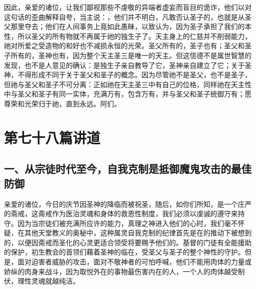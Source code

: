 因此，亲爱的诸位，让我们鄙视那些不虔敬的异端者虚妄而盲目的诡诈，他们以对这句话的歪曲解释自夸，当主说：，他们并不明白，凡敢否认圣子的，也就是从圣父那里夺去；他们在人间事务上竟如此愚昧，以致认为，因为圣子承担了我们的本性，所以圣父的所有物就不再属于祂的独生子了。天主身上的仁慈并不削弱能力，祂对所爱之受造物的和好也不减损永恒的光荣。圣父所有的，圣子也有；圣父和圣子所有的，圣神也有，因为整个天主圣三是唯一的天主。但这信德不是属世智慧的发现，也不是人意见的确认：是独生子亲自教导了它，圣神亲自建立了它；关于圣神，不得形成不同于关于圣父和圣子的概念。因为尽管祂不是圣父，也不是圣子，但祂与圣父和圣子不可分离：正如祂在天主圣三中有自己的位格，同样祂在天主性中与圣父和圣子有同一实体，充满万有，包含万有，并与圣父和圣子统御万有；愿尊荣和光荣归于祂，直到永远。阿们。\par



\section{第七十八篇讲道}

\par


\subsection{一、从宗徒时代至今，自我克制是抵御魔鬼攻击的最佳防御}

亲爱的诸位，今日的庆节因圣神的降临而被祝圣，随后，如你们所知，是一个庄严的斋戒，这斋戒作为医治灵魂和身体的救恩性制度，我们必须以虔诚的遵守来持守。因为当宗徒们被充满所应许的能力，真理之神进入他们的心时，我们毫不怀疑，在其他天堂教义的奥秘中，这种属灵自我克制的纪律首先是在的推动下被想到的，以便因斋戒而圣化的心灵更适合领受将要赐予他们的。基督的门徒有全能援助的保护，初生教会的首领们藉着圣神的临在，受圣父与圣子的整个神性的守护。但是，面对迫害者威胁的攻击，面对不敬神者的可怕呼喊，他们不能用肉体的力量或娇纵的肉身来战斗，因为取悦外在的事物最伤害内在的人，一个人的肉体越受制伏，理性灵魂就越纯洁。\par

